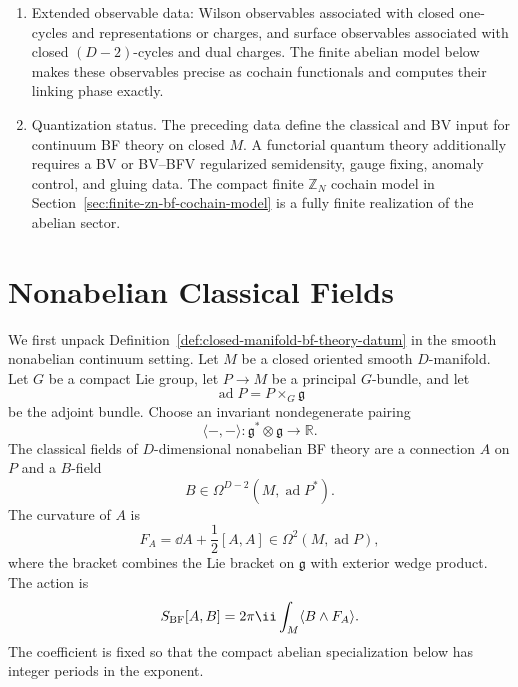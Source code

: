 \begin{definition}
\begin{enumerate}[label=\textup{(\roman*)}]
      shift reducibility chain is naturally a derived symmetry over the
      flat-connection locus \(F_A=0\); in the abelian specialization the same
      chain is an off-shell cochain complex because \(\dd^2=0\).
\item Extended observable data: Wilson observables associated with closed
      one-cycles and representations or charges, and surface observables
      associated with closed \((D-2)\)-cycles and dual charges.  The finite
      abelian model below makes these observables precise as cochain
      functionals and computes their linking phase exactly.
\item Quantization status.  The preceding data define the classical and BV
      input for continuum BF theory on closed \(M\).  A functorial quantum
      theory additionally requires a BV or BV--BFV regularized semidensity,
      gauge fixing, anomaly control, and gluing data.  The compact finite
      \(\mathbb Z_N\) cochain model in
      Section~\ref{sec:finite-zn-bf-cochain-model} is a fully finite
      realization of the abelian sector.
\end{enumerate}
\end{definition}

\section{Nonabelian Classical Fields}

We first unpack Definition~\ref{def:closed-manifold-bf-theory-datum} in the
smooth nonabelian continuum setting.  Let \(M\) be a closed oriented smooth
\(D\)-manifold.  Let \(G\) be a compact Lie group, let \(P\to M\) be a
principal \(G\)-bundle, and let
\[
  \operatorname{ad}P=P\times_G\mathfrak g
\]
be the adjoint bundle.  Choose an invariant nondegenerate pairing
\[
  \langle-,-\rangle:\mathfrak g^*\otimes\mathfrak g\longrightarrow\mathbb R .
\]
The classical fields of \(D\)-dimensional nonabelian BF theory are a
connection \(A\) on \(P\) and a \(B\)-field
\[
  B\in\Omega^{D-2}(M,\operatorname{ad}P^*).
\]
The curvature of \(A\) is
\[
  F_A=\dd A+\frac12[A,A]\in\Omega^2(M,\operatorname{ad}P),
\]
where the bracket combines the Lie bracket on \(\mathfrak g\) with exterior
wedge product.  The action is
\begin{equation}
  S_{\rm BF}[A,B]
  =
  2\pi\ii\int_M \langle B\wedge F_A\rangle .
  \label{eq:bf-action-nonabelian}
\end{equation}
The coefficient is fixed so that the compact abelian specialization below has
integer periods in the exponent.

